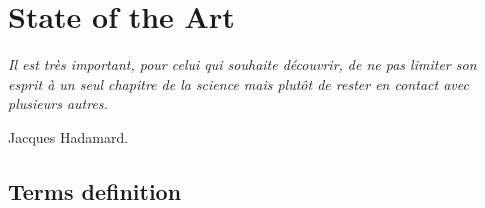 \chapter{State of the Art}\label{STATE}
\smallskip
\hfill
\begin{minipage}[b]{8cm}
{\it Il est tr\`es important, pour celui qui souhaite d\'ecouvrir, de ne pas limiter son esprit \`a un seul chapitre de la
science mais plut\^ot de rester en contact avec plusieurs autres.}
\end{minipage}
\begin{flushright} Jacques Hadamard. \end{flushright}
\vskip 2cm

\section{Terms definition}

